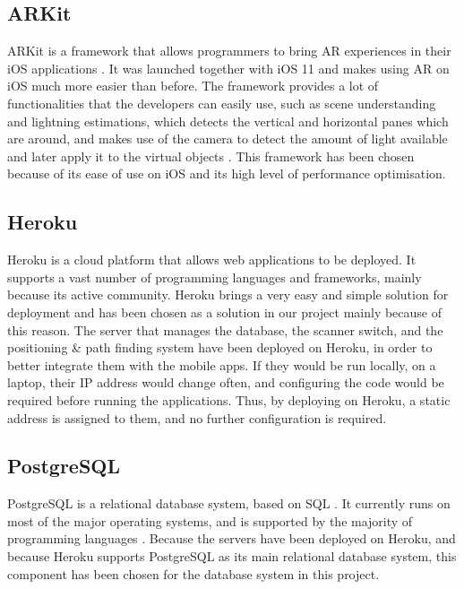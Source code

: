 \subsection{ARKit}
ARKit is a framework that allows programmers to bring AR experiences in their iOS applications \cite{arkit}. It was launched together with iOS 11 and makes using AR on iOS much more easier than before. The framework provides a lot of functionalities that the developers can easily use, such as scene understanding and lightning estimations, which detects the vertical and horizontal panes which are around, and makes use of the camera to detect the amount of light available and later apply it to the virtual objects \cite{arkit}. This framework has been chosen because of its ease of use on iOS and its high level of performance optimisation.

\subsection{Heroku}
Heroku is a cloud platform that allows web applications to be deployed. It supports a vast number of programming languages and frameworks, mainly because its active community. Heroku brings a very easy and simple solution for deployment and has been chosen as a solution in our project mainly because of this reason. The server that manages the database, the scanner switch, and the positioning \& path finding system have been deployed on Heroku, in order to better integrate them with the mobile apps. If they would be run locally, on a laptop, their IP address would change often, and configuring the code would be required before running the applications. Thus, by deploying on Heroku, a static address is assigned to them, and no further configuration is required.

\subsection{PostgreSQL}
PostgreSQL is a relational database system, based on SQL \cite{postgresql}. It currently runs on most of the major operating systems, and is supported by the majority of programming languages \cite{postgresql}. Because the servers have been deployed on Heroku, and because Heroku supports PostgreSQL as its main relational database system, this component has been chosen for the database system in this project.

\newpage
